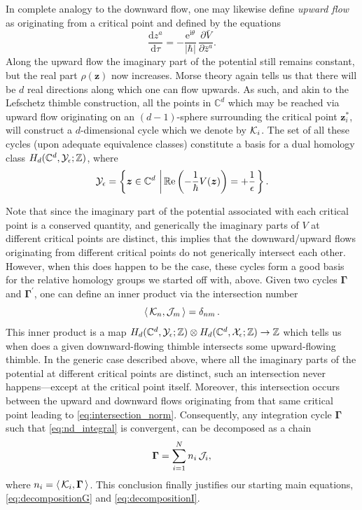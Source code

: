 \documentclass[11pt,a4paper]{article}
\newcommand{\CJ}{{\cal J}}
\newcommand{\CK}{{\cal K}}
\newcommand{\CX}{{\cal X}}
\newcommand{\CY}{{\cal Y}}
\def\BZ{{\mathbb Z}}
\def\BC{{\mathbb C}}
\newcommand{\be}{\begin{equation}}
\newcommand{\ee}{\end{equation}}
\def\re{{\mathbb{R}}{\mathrm{e}}}
\newcommand{\rme}{{\mathrm{e}}}
\newcommand{\rmi}{{\mathrm{i}}}
\newcommand{\rmd}{{\mathrm{d}}}
\begin{document}
In complete analogy to the downward flow, one may likewise define \textit{upward flow} as originating from a critical point and defined by the equations
%
\be
\frac{\rmd z^a}{\rmd\tau} = - \frac{\rme^{\rmi\theta}}{|\hbar|}\, \frac{\partial\bar{V}}{\partial\bar{z}^a}.
\ee
%
\noindent
Along the upward flow the imaginary part of the potential still remains constant, but the real part $\rho (\boldsymbol{z})$ now increases. Morse theory again tells us that there will be $d$ real directions along which one can flow upwards. As such, and akin to the Lefschetz thimble construction, all the points in $\BC^d$ which may be reached via upward flow originating on an $(d-1)$-sphere surrounding the critical point $\boldsymbol{z}^*_i$, will construct a $d$-dimensional cycle which we denote by $\CK_i$. The set of all these cycles (upon adequate equivalence classes) constitute a basis for a dual homology class $H_d ( \BC^d, \CY_\epsilon; \BZ )$, where
%
\be
\CY_{\epsilon} = \left\{ \boldsymbol{z} \in \BC^d\, \left|\, \re \left( - \frac{1}{\hbar} V (\boldsymbol{z}) \right) = + \frac{1}{\epsilon} \right. \right\}. 
\ee

Note that since the imaginary part of the potential associated with each critical point is a conserved quantity, and generically the imaginary parts of $V$ at different critical points are distinct, this implies that the downward/upward flows originating from different critical points do not generically intersect each other. However, when this does happen to be the case, these cycles form a good basis for the relative homology groups we started off with, above. Given two cycles $\boldsymbol{\Gamma}$ and $\boldsymbol{\Gamma}^\prime$, one can define an inner product via the intersection number
%
\be
\label{eq:intersection_norm}
\left\langle\, \CK_n, \CJ_m\, \right\rangle = \delta_{nm}\,.
\ee
%
\noindent
This inner product is a map $H_d ( \BC^d, \CY_\epsilon; \BZ ) \otimes H_d ( \BC^d, \CX_\epsilon; \BZ ) \to \BZ$ which tells us when does a given downward-flowing thimble intersects some upward-flowing thimble. In the generic case described above, where all the imaginary parts of the potential at different critical points are distinct, such an intersection never happens---except at the critical point itself. Moreover, this intersection occurs between the upward and downward flows originating from that same critical point leading to \eqref{eq:intersection_norm}. Consequently, any integration cycle $\boldsymbol{\Gamma}$ such that \eqref{eq:nd_integral} is convergent, can be decomposed as a chain \cite{p83}
%
\be
\label{eq:decomposition}
\boldsymbol{\Gamma} = \sum_{i=1}^N n_i\, \CJ_i,
\ee
%
\noindent
where $n_i= \left\langle\, \CK_i, \boldsymbol{\Gamma}\, \right\rangle$. This conclusion finally justifies our starting main equations, \eqref{eq:decompositionG} and \eqref{eq:decompositionI}.
\end{document}

